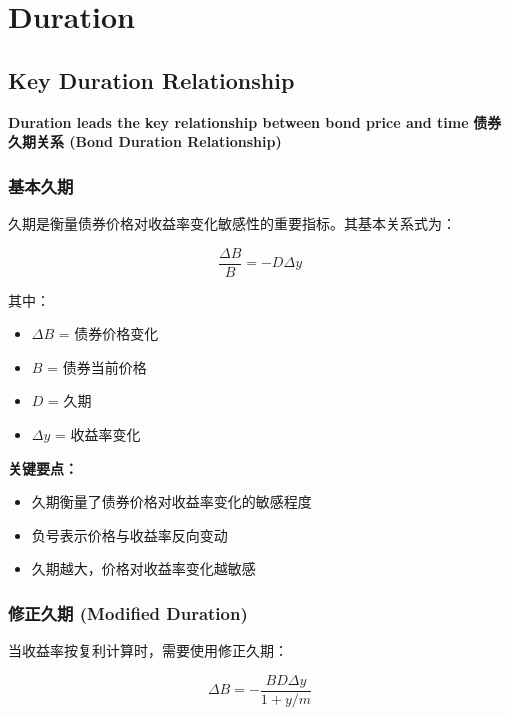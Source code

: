 \chapter{Duration}


\section{Key Duration Relationship}

\textbf{Duration leads the key relationship between bond price and time}
\textbf{债券久期关系 (Bond Duration Relationship)}

\subsection{基本久期}

久期是衡量债券价格对收益率变化敏感性的重要指标。其基本关系式为：

\begin{equation}
\frac{\Delta B}{B} = -D\Delta y
\end{equation}

\noindent 其中：
\begin{itemize}
    \item $\Delta B$ = 债券价格变化
    \item $B$ = 债券当前价格
    \item $D$ = 久期
    \item $\Delta y$ = 收益率变化
\end{itemize}

\textbf{关键要点：}
\begin{itemize}
    \item 久期衡量了债券价格对收益率变化的敏感程度
    \item 负号表示价格与收益率反向变动
    \item 久期越大，价格对收益率变化越敏感
\end{itemize}

\subsection{修正久期 (Modified Duration)}

当收益率按复利计算时，需要使用修正久期：

\begin{equation}
\Delta B = -\frac{BD\Delta y}{1 + y/m}
\end{equation}

